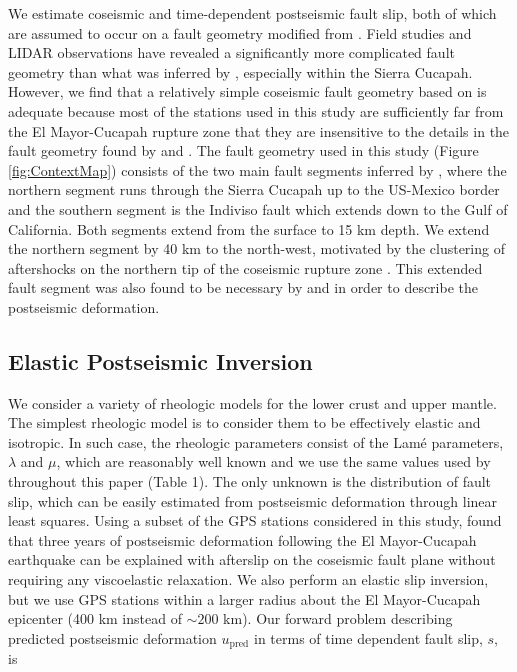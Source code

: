 \documentclass[draft,linenumbers]{AGUJournal}
\begin{document}
We estimate coseismic and time-dependent postseismic fault slip, both of which are assumed to occur on a fault geometry modified from \citet{Wei2011}.  Field studies \citep{Fletcher2014} and LIDAR observations \citep{Oskin2012} have revealed a significantly more complicated fault geometry than what was inferred by \citet{Wei2011}, especially within the Sierra Cucapah.  However, we find that a relatively simple coseismic fault geometry based on \citep{Wei2011} is adequate because most of the stations used in this study are sufficiently far from the El Mayor-Cucapah rupture zone that they are insensitive to the details in the fault geometry found by \citet{Fletcher2014} and \citet{Oskin2012}.  The fault geometry used in this study (Figure \ref{fig:ContextMap}) consists of the two main fault segments inferred by \citet{Wei2011}, where the northern segment runs through the Sierra Cucapah up to the US-Mexico border and the southern segment is the Indiviso fault which extends down to the Gulf of California. Both segments extend from the surface to 15 km depth.  We extend the northern segment by 40 km to the north-west, motivated by the clustering of aftershocks on the northern tip of the coseismic rupture zone \citep{Hauksson2011,Kroll2013}.  This extended fault segment was also found to be necessary by \citet{Rollins2015} and \citet{Pollitz2012} in order to describe the postseismic deformation. 

\subsection{Elastic Postseismic Inversion}\label{sec:ElasticInversion}    
We consider a variety of rheologic models for the lower crust and upper mantle. The simplest rheologic model is to consider them to be effectively elastic and isotropic.  In such case, the rheologic parameters consist of the Lam\'e parameters, $\lambda$ and $\mu$, which are reasonably well known and we use the same values used by \citet{Wei2011} throughout this paper (Table 1).  The only unknown is the distribution of fault slip, which can be easily estimated from postseismic deformation through linear least squares.  Using a subset of the GPS stations considered in this study, \citet{Rollins2015} found that three years of postseismic deformation following the El Mayor-Cucapah earthquake can be explained with afterslip on the coseismic fault plane without requiring any viscoelastic relaxation. We also perform an elastic slip inversion, but we use GPS stations within a larger radius about the El Mayor-Cucapah epicenter (400 km instead of ${\sim}200$ km). Our forward problem describing predicted postseismic deformation $u_\mathrm{pred}$ in terms of time dependent fault slip, $s$, is
\end{document}
